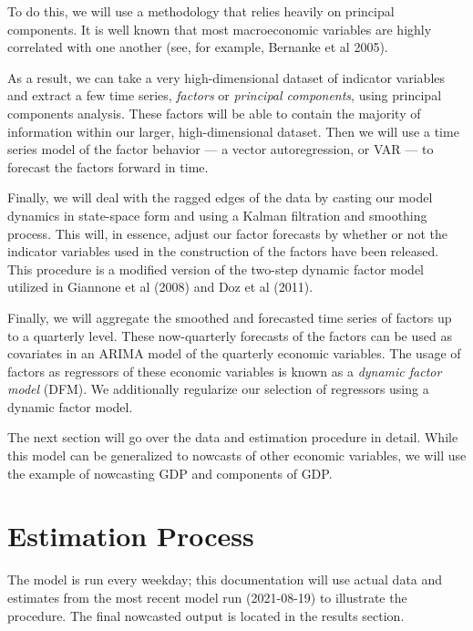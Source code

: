 \documentclass[11pt, letterpaper]{article}\usepackage[]{graphicx}\usepackage[]{color}
\makeatletter
\newenvironment{kframe}{%
 \def\at@end@of@kframe{}%
 \ifinner\ifhmode%
  \def\at@end@of@kframe{\end{minipage}}%
  \begin{minipage}{\columnwidth}%
 \fi\fi%
 \def\FrameCommand##1{\hskip\@totalleftmargin \hskip-\fboxsep
 \colorbox{shadecolor}{##1}\hskip-\fboxsep
     \hskip-\linewidth \hskip-\@totalleftmargin \hskip\columnwidth}%
 \MakeFramed {\advance\hsize-\width
   \@totalleftmargin\z@ \linewidth\hsize
   \@setminipage}}%
 {\par\unskip\endMakeFramed%
 \at@end@of@kframe}
\makeatother
\begin{document}
To do this, we will use a methodology that relies heavily on principal components. It is well known that most macroeconomic variables are highly correlated with one another (see, for example, Bernanke et al 2005).
\begin{kframe}


{\ttfamily\noindent\bfseries\color{errorcolor}{\#\# Error in loadNamespace(x): there is no package called 'corrr'}}\end{kframe}
As a result, we can take a very high-dimensional dataset of indicator variables and extract a few time series, \textit{factors} or \textit{principal components}, using principal components analysis. These factors will be able to contain the majority of information within our larger, high-dimensional dataset. Then we will use a time series model of the factor behavior --- a vector autoregression, or VAR --- to forecast the factors forward in time. 

Finally, we will deal with the ragged edges of the data by casting our model dynamics in state-space form and using a Kalman filtration and smoothing process. This will, in essence, adjust our factor forecasts by whether or not the indicator variables used in the construction of the factors have been released. This procedure is a modified version of the two-step dynamic factor model utilized in Giannone et al (2008) and Doz et al (2011).

Finally, we will aggregate the smoothed and forecasted time series of factors up to a quarterly level. These now-quarterly forecasts of the factors can be used as covariates in an ARIMA model of the quarterly economic variables. The usage of factors as regressors of these economic variables is known as a \textit{dynamic factor model} (DFM). We additionally regularize our selection of regressors using a dynamic factor model.

The next section will go over the data and estimation procedure in detail. While this model can be generalized to nowcasts of other economic variables, we will use the example of nowcasting GDP and components of GDP.

\newpage
\section{Estimation Process}
The model is run every weekday; this documentation will use actual data and estimates from the most recent model run (2021-08-19) to illustrate the procedure. The final nowcasted output is located in the results section.
\end{document}
